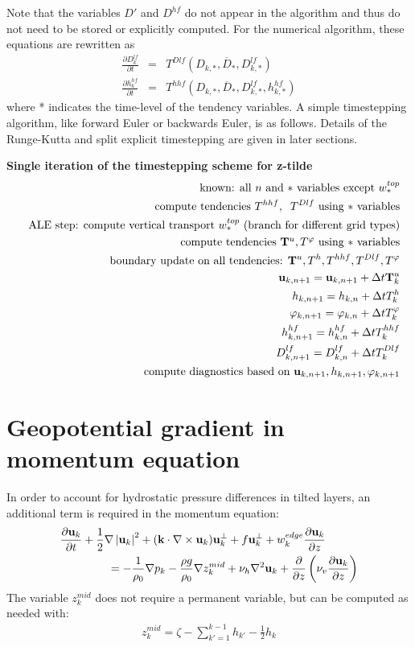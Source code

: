\documentclass[11pt]{report}
\newcommand{\ds}{\displaystyle}
\newcommand{\bea}{\begin{eqnarray}}
\newcommand{\eea}{\end{eqnarray}}
\begin{document}
Note that the variables $D'$ and $D^{hf}$ do not appear in the algorithm and thus do not need to be stored or explicitly computed.  For the numerical algorithm, these equations are rewritten as
\bea
\label{h1t2} \ds
  \frac{\partial D^{lf}_k}{\partial t} &=& T^{Dlf}(D_{k,*}, {\overline D}_*,D^{lf}_{k,*}) \\
  \frac{\partial h^{hf}_k}{\partial t} &=& T^{hhf}(D_{k,*}, {\overline D}_*, D^{lf}_{k,*}, h_{k,*}^{hf})
\eea
where * indicates the time-level of the tendency variables.  A simple timestepping algorithm, like forward Euler or backwards Euler, is as follows.  Details of the Runge-Kutta and split explicit timestepping are given in later sections.

{\bf Single iteration of the timestepping scheme for z-tilde}
\begin{eqnarray} &&
\mbox{known: all $n$ and $*$ variables except $w^{top}_*$}\\&&
\mbox{compute tendencies } 
T^{hhf}, \;\;
T^{Dlf} \mbox{ using $*$ variables} \\ && 
\mbox{ALE step: compute vertical transport $w^{top}_*$} 
\mbox{ (branch for different grid types)}\\ && 
\mbox{compute tendencies ${\bf T}^u, T^\varphi $ using $*$ variables}\\ && 
\mbox{boundary update on all tendencies: } {\bf T}^u,T^h,T^{hhf},T^{Dlf},T^\varphi\\&& 
{\bf u}_{k,n+1} = {\bf u}_{k,n+1} + \Delta t {\bf T}^u_k \\&& 
h_{k,n+1} = h_{k,n} + \Delta t T^h_k \\&& 
{\varphi}_{k,n+1} =  \varphi_{k,n} + \Delta t  T^\varphi_k \\&&
h^{hf}_{k,n+1} = h^{hf}_{k,n} + \Delta t T^{hhf}_k \\&& 
D^{lf}_{k,n+1} = D^{lf}_{k,n} + \Delta t T^{Dlf}_k \\&& 
\mbox{compute diagnostics based on }{\bf u}_{k,n+1},h_{k,n+1},\varphi_{k,n+1} 
\end{eqnarray}



\section{Geopotential gradient in momentum equation}
In order to account for hydrostatic pressure differences in tilted layers, an additional term is required in the momentum equation:
\bea 
\label{u2} \ds
\frac{\partial {\bf u}_k}{\partial t} 
+ \frac{1}{2}\nabla \left| {\bf u}_k \right|^2 
+ ( {\bf k} \cdot \nabla \times {\bf u}_k) {\bf u}^\perp_k 
+ f{\bf u}^{\perp}_k 
+ w_k^{edge}\frac{\partial {\bf u}_k}{\partial z} \hspace{1cm} \nonumber \\
  = - \frac{1}{\rho_0}\nabla p_k  - \frac{\rho g}{\rho_0}\nabla z^{mid}_k
   +\nu_h\nabla^2{\bf u}_k
 + \frac{\partial }{\partial z} 
\left( \nu_v \frac{\partial {\bf u}_k}{\partial z} \right)
\eea
The variable $z^{mid}_k$ does not require a permanent variable, but can be computed as needed with:
\bea
z^{mid}_k = \zeta - \sum\limits_{k'=1}^{k-1}  h_{k'} - \frac{1}{2}h_k
\eea
\end{document}
